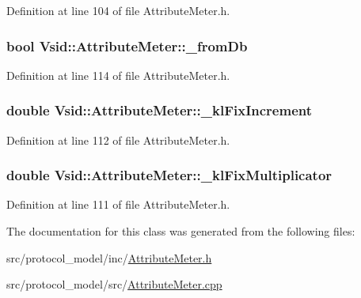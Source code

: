 Definition at line 104 of file Attribute\-Meter.\-h.

\hypertarget{class_vsid_1_1_attribute_meter_a2ce3946fc699d3c375ee4019a9e3c022}{
\subsubsection[{\-\_\-from\-Db}]{\setlength{\rightskip}{0pt plus 5cm}bool Vsid\-::\-Attribute\-Meter\-::\-\_\-from\-Db\hspace{0.3cm}{\ttfamily [protected]}}}\label{class_vsid_1_1_attribute_meter_a2ce3946fc699d3c375ee4019a9e3c022}


Definition at line 114 of file Attribute\-Meter.\-h.

\hypertarget{class_vsid_1_1_attribute_meter_ac66c9e0062e1c4a1617dab984ed6c4a5}{
\subsubsection[{\-\_\-kl\-Fix\-Increment}]{\setlength{\rightskip}{0pt plus 5cm}double Vsid\-::\-Attribute\-Meter\-::\-\_\-kl\-Fix\-Increment\hspace{0.3cm}{\ttfamily [protected]}}}\label{class_vsid_1_1_attribute_meter_ac66c9e0062e1c4a1617dab984ed6c4a5}


Definition at line 112 of file Attribute\-Meter.\-h.

\hypertarget{class_vsid_1_1_attribute_meter_a81d9c3a4e7d24af443803f980028c2db}{
\subsubsection[{\-\_\-kl\-Fix\-Multiplicator}]{\setlength{\rightskip}{0pt plus 5cm}double Vsid\-::\-Attribute\-Meter\-::\-\_\-kl\-Fix\-Multiplicator\hspace{0.3cm}{\ttfamily [protected]}}}\label{class_vsid_1_1_attribute_meter_a81d9c3a4e7d24af443803f980028c2db}


Definition at line 111 of file Attribute\-Meter.\-h.



The documentation for this class was generated from the following files\-:\begin{DoxyCompactItemize}
\item 
src/protocol\-\_\-model/inc/\hyperlink{_attribute_meter_8h}{Attribute\-Meter.\-h}\item 
src/protocol\-\_\-model/src/\hyperlink{_attribute_meter_8cpp}{Attribute\-Meter.\-cpp}\end{DoxyCompactItemize}
